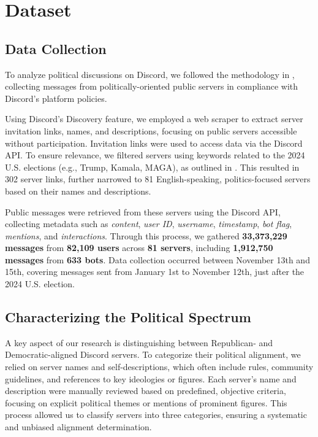 \section{Dataset}
\label{sec:dataset}

\subsection{Data Collection}

To analyze political discussions on Discord, we followed the methodology in \cite{singh2024Cross-Platform}, collecting messages from politically-oriented public servers in compliance with Discord's platform policies.

Using Discord's Discovery feature, we employed a web scraper to extract server invitation links, names, and descriptions, focusing on public servers accessible without participation. Invitation links were used to access data via the Discord API. To ensure relevance, we filtered servers using keywords related to the 2024 U.S. elections (e.g., Trump, Kamala, MAGA), as outlined in \cite{balasubramanian2024publicdatasettrackingsocial}. This resulted in 302 server links, further narrowed to 81 English-speaking, politics-focused servers based on their names and descriptions.

Public messages were retrieved from these servers using the Discord API, collecting metadata such as \textit{content}, \textit{user ID}, \textit{username}, \textit{timestamp}, \textit{bot flag}, \textit{mentions}, and \textit{interactions}. Through this process, we gathered \textbf{33,373,229 messages} from \textbf{82,109 users} across \textbf{81 servers}, including \textbf{1,912,750 messages} from \textbf{633 bots}. Data collection occurred between November 13th and 15th, covering messages sent from January 1st to November 12th, just after the 2024 U.S. election.

\subsection{Characterizing the Political Spectrum}
\label{sec:timeline}

A key aspect of our research is distinguishing between Republican- and Democratic-aligned Discord servers. To categorize their political alignment, we relied on server names and self-descriptions, which often include rules, community guidelines, and references to key ideologies or figures. Each server's name and description were manually reviewed based on predefined, objective criteria, focusing on explicit political themes or mentions of prominent figures. This process allowed us to classify servers into three categories, ensuring a systematic and unbiased alignment determination.

